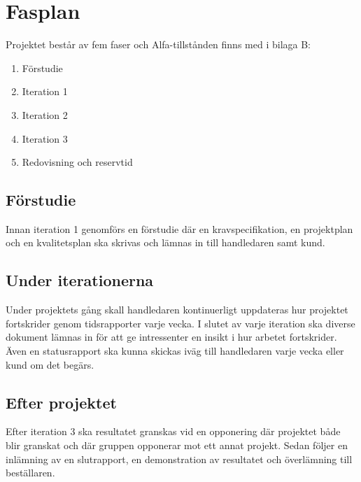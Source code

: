 \section{Fasplan}
Projektet består av fem faser och Alfa-tillstånden finns med i bilaga B:
\begin{enumerate}
\item Förstudie
\item Iteration 1
\item Iteration 2
\item Iteration 3
\item Redovisning och reservtid
\end{enumerate}

\subsection{Förstudie}
Innan iteration 1 genomförs en förstudie där en  kravspecifikation, en projektplan och en kvalitetsplan ska skrivas och lämnas in till handledaren samt kund. 

\subsection{Under iterationerna}

Under projektets gång skall handledaren kontinuerligt uppdateras hur projektet fortskrider genom tidsrapporter varje vecka. I slutet av varje iteration ska diverse dokument lämnas in för att ge intressenter en insikt i hur arbetet fortskrider. Även en statusrapport ska kunna skickas iväg till handledaren varje vecka eller kund om det begärs. 


\subsection{Efter projektet}
Efter iteration 3 ska resultatet granskas vid en opponering där projektet både blir granskat och där gruppen opponerar mot ett annat projekt. Sedan följer en inlämning av en slutrapport, en demonstration av resultatet och överlämning till beställaren. 
